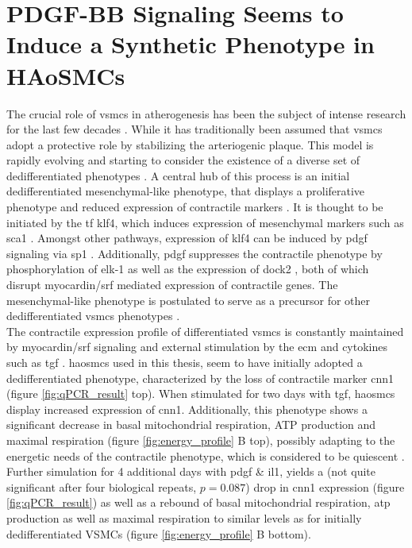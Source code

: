 \section{PDGF-BB Signaling Seems to Induce a Synthetic Phenotype in HAoSMCs}
The crucial role of \acp{vsmc} in atherogenesis has been the subject of intense research for the last few decades \cite{grootaertVascularSmoothMuscle2021, yapSixShadesVascular2021}. While it has traditionally been assumed that \acp{vsmc} adopt a protective role by stabilizing the arteriogenic plaque. This model is rapidly evolving and starting to consider the existence of a diverse set of dedifferentiated phenotypes \cite{liuSmoothMuscleCell2019}. A central hub of this process is an initial dedifferentiated mesenchymal-like phenotype, that displays a proliferative phenotype and reduced expression of contractile markers \cite{yapSixShadesVascular2021}. It is thought to be initiated by the \ac{tf} \ac{klf4}, which induces expression of mesenchymal markers such as \ac{sca1} \cite{yapSixShadesVascular2021}. Amongst other pathways, expression of \ac{klf4} can be induced by \ac{pdgf} signaling \cite{liuKruppellikeFactorAbrogates2005} via \ac{sp1} \cite{deatonSp1dependentActivationKLF42009}. Additionally, \ac{pdgf} suppresses the contractile phenotype by phosphorylation of \ac{elk-1} \cite{wangMyocardinTernaryComplex2004} as well as the expression of \ac{dock2} \cite{guoDedicatorCytokinesisNovel2015}, both of which disrupt myocardin/\ac{srf} mediated expression of contractile genes. The mesenchymal-like phenotype is postulated to serve as a precursor for other dedifferentiated \acp{vsmc} phenotypes \cite{yapSixShadesVascular2021}.\\
The contractile expression profile of differentiated \acp{vsmc} is constantly maintained by myocardin/\ac{srf} signaling \cite{longMyocardinSufficientSmooth2008} and external stimulation by the \ac{ecm} and cytokines such as \ac{tgf} \cite{davis-dusenberyDownregulationKruppellikeFactor42011}. \acp{haosmc} used in this thesis, seem to have initially adopted a dedifferentiated phenotype, characterized by the loss of contractile marker \ac{cnn1} \cite{owensMolecularRegulationVascular2004} (figure \ref{fig:qPCR_result} top). When stimulated for two days with \ac{tgf}, \acp{haosmc} display increased expression of \ac{cnn1}. Additionally, this phenotype shows a significant decrease in  basal mitochondrial respiration, ATP production and maximal respiration (figure \ref{fig:energy_profile} B top), possibly adapting to the energetic needs of the contractile phenotype, which is considered to be quiescent \cite{dobnikarDiseaserelevantTranscriptionalSignatures2018}. Further simulation for 4 additional days with \ac{pdgf} \& \ac{il1}, yields a (not quite significant after four biological repeats, $p=0.087$) drop in \ac{cnn1} expression (figure \ref{fig:qPCR_result}) as well as a rebound of basal mitochondrial respiration, \ac{atp} production as well as maximal respiration to similar levels as for initially dedifferentiated VSMCs (figure \ref{fig:energy_profile} B bottom).\\
